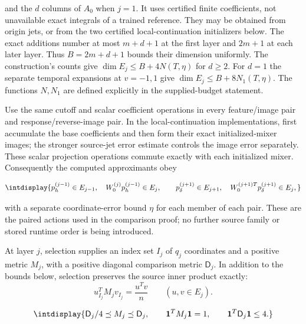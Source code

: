 
and the \(d\) columns of \(A_0\) when \(j=1\). It uses certified finite coefficients, not unavailable exact integrals of a trained reference. They may be obtained from origin jets, or from the two certified local-continuation initializers below. The exact additions number at most \(m+d+1\) at the first layer and \(2m+1\) at each later layer. Thus \(B=2m+d+1\) bounds their dimension uniformly. The construction's counts give \(\dim E_j\le B+4N(T,\allowbreak \eta)\) for \(d\ge2\). For \(d=1\) the separate temporal expansions at \(v=-1,\allowbreak 1\) give \(\dim E_j\le B+8N_1(T,\allowbreak \eta)\). The functions \(N,\allowbreak N_1\) are defined explicitly in the supplied-budget statement.



Use the same cutoff and scalar coefficient operations in every feature/image pair and response/reverse-image pair. In the local-continuation implementations, first accumulate the base coefficients and then form their exact initialized-mixer images; the stronger source-jet error estimate controls the image error separately. These scalar projection operations commute exactly with each initialized mixer. Consequently the computed approximants obey


\begingroup\renewcommand{\theHequation}{intdisplay.156}
\begin{equation}
\intdisplay{
p_h^{(j-1)}\in E_{j-1},\quad W_0^{(j)}p_h^{(j-1)}\in E_j,\qquad
p_\delta^{(j+1)}\in E_{j+1},\quad
W_0^{(j+1)T}p_\delta^{(j+1)}\in E_j,
}
\label{int:eq-0059-harmonic-paired-source-membership}
\end{equation}
\endgroup


with a separate coordinate-error bound \(\eta\) for each member of each pair. These are the paired actions used in the comparison proof; no further source family or stored runtime order is being introduced.



At layer \(j\), selection supplies an index set \(I_j\) of \(q_j\) coordinates and a positive metric \(M_j\), with a positive diagonal comparison metric \(\mathsf D_j\). In addition to the bounds below, selection preserves the source inner product exactly:
\[
 u_{I_j}^{T}M_jv_{I_j}=\frac{u^Tv}{n}
 \qquad(u,v\in E_j).
\]


\begingroup\renewcommand{\theHequation}{intdisplay.157}
\begin{equation}
\intdisplay{
\mathsf D_j/4\preceq M_j\preceq\mathsf D_j,
\qquad \mathbf1^TM_j\mathbf1=1,\qquad
\mathbf1^T\mathsf D_j\mathbf1\le4.
}
\label{int:eq-0060-harmonic-metric-conditions}
\end{equation}
\endgroup

